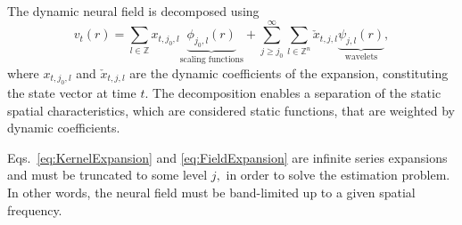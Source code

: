 \documentclass[review,authoryear,3p]{elsarticle}
\begin{document}
The dynamic neural field is decomposed using
\begin{equation}
 v_t\left(r\right)=\sum_{l \in \mathbb{Z}}x_{t,j_{0},l} \underbrace{\phi_{j_0,l}\left(r\right)}_{\text{scaling functions}} + \sum_{j\geq j_0}^{\infty} \sum_{l \in \mathbb{Z}^n} \check{x}_{t,j,l} \underbrace{\psi_{j,l}\left(r\right)}_{\text{wavelets}},
\label{eq:FieldExpansion}
\end{equation}
where $x_{t,j_{0},l}$ and $\check{x}_{t,j,l} $ are the dynamic coefficients of the expansion, constituting the state vector at time $t$. The decomposition enables a separation of the static spatial characteristics, which are considered static functions, that are weighted by dynamic coefficients.

Eqs.~\eqref{eq:KernelExpansion} and \eqref{eq:FieldExpansion} are infinite series expansions and must be truncated to some level $j,$ in order to solve the estimation problem. In other words, the neural field must be band-limited up to a given spatial frequency. 
\end{document}
